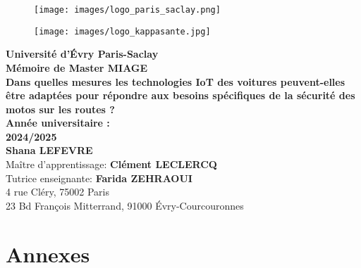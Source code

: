 \documentclass{article}
\begin{document}
\begin{titlepage}
    \begin{center}
        
        \begin{figure}[h]
            \centering
            \begin{minipage}[c]{0.45\textwidth}
                \centering
                \texttt{[image: images/logo\_paris\_saclay.png]}
            \end{minipage}
            \hfill
            \begin{minipage}[c]{0.45\textwidth}
                \centering
                \texttt{[image: images/logo\_kappasante.jpg]}
            \end{minipage}
        \end{figure}
   

        {\Large \textbf{Université d'Évry Paris-Saclay}}\\[0.5cm]
        {\Large \textbf{Mémoire de Master MIAGE}}\\[2cm]

        {\huge \textbf{Dans quelles mesures les technologies IoT des voitures peuvent-elles être adaptées pour répondre aux besoins spécifiques de la sécurité des motos sur les routes ? }}\\[1cm]
        {\Large\textbf{Année universitaire :}} \\[0.5cm]
        {\Large \textbf{2024/2025}}\\[1cm]
        {\Large \textbf{Shana LEFEVRE}}\\[2cm]
        {\Large Maître d'apprentissage: \textbf{Clément LECLERCQ}}\\[0.5cm]
        {\Large Tutrice enseignante: \textbf{Farida ZEHRAOUI}}\\[3cm]
        {\Large{4 rue Cléry, 75002 Paris}} \\
        {\Large{23 Bd François Mitterrand, 91000 Évry-Courcouronnes}} \\[0.5cm]
    \end{center}
\end{titlepage}


\tableofcontents %

\newpage

\newpage

\newpage

\newpage

\newpage


\newpage
\printbibliography
{}

\newpage
\appendix
\section*{Annexes}
\end{document}
